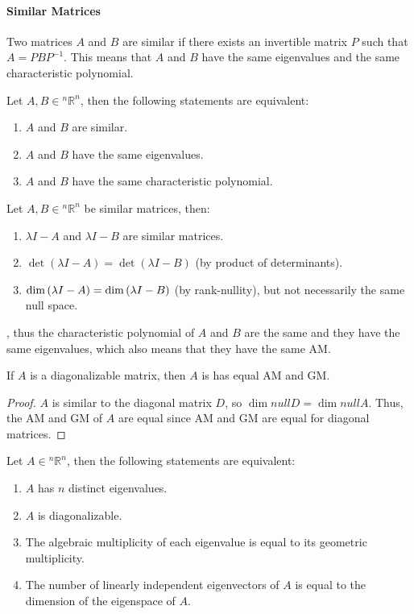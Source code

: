 \documentclass[11pt]{article}
\begin{document}
\paragraph{Similar Matrices} Two matrices $A$ and $B$ are similar if there exists an invertible matrix $P$ such that $A = PBP^{-1}$. This means that $A$ and $B$ have the same eigenvalues and the same characteristic polynomial.
\begin{theorem}
    Let $A, B \in {^n\mathbb{R}^n}$, then the following statements are equivalent:
    \begin{enumerate}
        \item $A$ and $B$ are similar.
        \item $A$ and $B$ have the same eigenvalues.
        \item $A$ and $B$ have the same characteristic polynomial.
    \end{enumerate}
\end{theorem}
\begin{theorem}
    Let $A, B \in {^n\mathbb{R}^n}$ be similar matrices, then:
    \begin{enumerate}
        \item $\lambda I - A$ and $\lambda I - B$ are similar matrices.
        \item $\det(\lambda I - A) = \det(\lambda I - B)$ (by product of determinants).
        \item $\dim \null (\lambda I - A) = \dim \null (\lambda I - B)$ (by rank-nullity), but not necessarily the same null space. 
    \end{enumerate}
    , thus the characteristic polynomial of $A$ and $B$ are the same and they have the same eigenvalues, which also means that they have the same AM.
\end{theorem}
\begin{theorem}
    If $A$ is a diagonalizable matrix, then $A$ is has equal AM and GM.
\end{theorem}
\begin{proof}
    $A$ is similar to the diagonal matrix $D$, so $\dim null D = \dim null A$. Thus, the AM and GM of $A$ are equal since AM and GM are equal for diagonal matrices.
\end{proof}
\begin{theorem}
    Let $A \in {^n\mathbb{R}^n}$, then the following statements are equivalent:
    \begin{enumerate}
        \item $A$ has $n$ distinct eigenvalues.
        \item $A$ is diagonalizable.
        \item The algebraic multiplicity of each eigenvalue is equal to its geometric multiplicity.
        \item The number of linearly independent eigenvectors of $A$ is equal to the dimension of the eigenspace of $A$.
    \end{enumerate}
\end{theorem}
\end{document}
